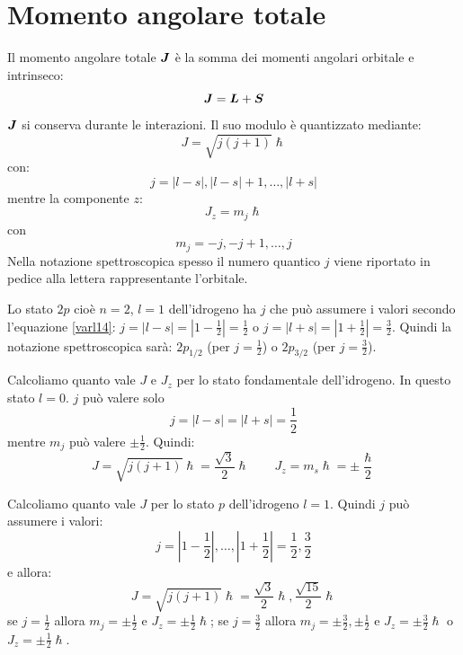 \section{Momento angolare totale}
Il momento angolare totale $\boldsymbol{J}$ è la somma dei momenti angolari orbitale e intrinseco:
\begin{equation}
	\boldsymbol{J}=\boldsymbol{L}+\boldsymbol{S}
\end{equation}
$\boldsymbol{J}$ si conserva durante le interazioni. Il suo modulo è quantizzato mediante:
\begin{equation}
	J=\sqrt{j(j+1)}\hslash
\end{equation}
con:
\begin{equation}
	j=|l-s|,|l-s|+1,\ldots,|l+s|
	\label{varl14}
\end{equation}
mentre la componente $z$:
\begin{equation}
	J_z=m_j\hslash
\end{equation}
con
\begin{equation}
	m_j=-j,-j+1,\ldots,j
\end{equation}
Nella notazione spettroscopica spesso il numero quantico $j$ viene riportato in pedice alla lettera rappresentante l'orbitale.
\begin{Es}[$2p$]
	Lo stato $2p$ cioè $n=2$, $l=1$ dell'idrogeno ha $j$ che può assumere i valori secondo l'equazione \eqref{varl14}:  $j=|l-s|=|1-\frac{1}{2}|=\frac{1}{2}$ o $j=|l+s|=|1+\frac{1}{2}|=\frac{3}{2}$. Quindi la notazione spettroscopica sarà: $2p_{1/2}$ (per $j=\frac{1}{2}$) o $2p_{3/2}$ (per $j=\frac{3}{2}$).
\end{Es}
\begin{Es}
	Calcoliamo quanto vale $J$ e $J_z$ per lo stato fondamentale dell'idrogeno. In questo stato $l=0$. $j$ può valere solo
	\[
		j=|l-s|=|l+s|=\frac{1}{2}
	\]
	mentre $m_j$ può valere $\pm\frac{1}{2}$.
	Quindi:
	\[
		J=\sqrt{j(j+1)}\hslash=\frac{\sqrt{3}}{2}\hslash\qquad J_z=m_s\hslash=\pm\frac{\hslash}{2}
	\]
\end{Es}
\begin{Es}[stato $p$]
	Calcoliamo quanto vale $J$ per lo stato $p$ dell'idrogeno $l=1$. Quindi $j$ può assumere i valori:
	\[
		j=|1-\frac{1}{2}|,\ldots,|1+\frac{1}{2}|=\frac{1}{2},\frac{3}{2}
	\]
	e allora:
	\[
		J=\sqrt{j(j+1)}\hslash=\frac{\sqrt{3}}{2}\hslash,\frac{\sqrt{15}}{2}\hslash
	\]
	se $j=\frac{1}{2}$ allora $m_j=\pm\frac{1}{2}$ e $J_z=\pm\frac{1}{2}\hslash$; se $j=\frac{3}{2}$ allora $m_j=\pm\frac{3}{2},\pm\frac{1}{2}$ e $J_z=\pm\frac{3}{2}\hslash$ o $J_z=\pm\frac{1}{2}\hslash$.
\end{Es}
